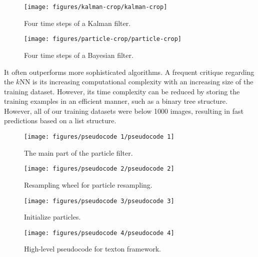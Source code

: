 \documentclass{report}
\begin{document}
\begin{figure}[h!]
\begin{center}
\texttt{[image: figures/kalman-crop/kalman-crop]}
\caption{{\label{fig:Kalman}
Four time steps of a Kalman filter.%
}}
\end{center}
\end{figure}

\begin{figure}[h!]
\begin{center}
\texttt{[image: figures/particle-crop/particle-crop]}
\caption{{\label{fig:bayesianfilter}
Four time steps of a Bayesian filter.%
}}
\end{center}
\end{figure}


It often outperforms more sophisticated algorithms. A frequent
critique regarding the $k$NN is its increasing computational
complexity with an increasing size of the training dataset. However,
its time complexity can be reduced by storing the training examples in
an efficient manner, such as a binary tree structure. However, all of
our training datasets were below 1000 images, resulting in fast
predictions based on a list structure.

\begin{figure}[h!]
\begin{center}
\texttt{[image: figures/pseudocode 1/pseudocode 1]}
\caption{{The main part of the particle filter.%
}}
\end{center}
\end{figure}

\begin{figure}[h!]
\begin{center}
\texttt{[image: figures/pseudocode 2/pseudocode 2]}
\caption{{Resampling wheel for particle resampling.%
}}
\end{center}
\end{figure}

\begin{figure}[h!]
\begin{center}
\texttt{[image: figures/pseudocode 3/pseudocode 3]}
\caption{{Initialize particles.%
}}
\end{center}
\end{figure}

\begin{figure}[h!]
\begin{center}
\texttt{[image: figures/pseudocode 4/pseudocode 4]}
\caption{{High-level pseudocode for texton framework.%
}}
\end{center}
\end{figure}
\end{document}

